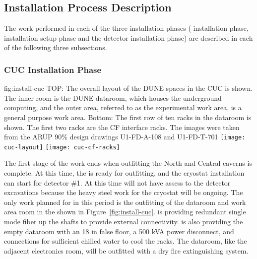 \subsection{Installation Process Description}
\label{sec:fdsp-tc-inst-proc}


The work performed in each of the three installation phases ( installation phase, installation setup phase and the detector installation phase) are described in each of the following three subsections.

\subsubsection{CUC Installation Phase}
\label{sec:fdsp-tc-inst-CUC}

\begin{dunefigure}{fig:install-cuc}
  {TOP: The overall layout of the DUNE spaces in the CUC is shown. The inner room is the DUNE dataroom, which houses the underground computing, and the outer area, referred to as the experimental work area, is a general purpose work area. Bottom: The first row of ten racks in the dataroom is shown. The first two racks are the  CF interface racks. The images were taken from the ARUP 90\% design drawings U1-FD-A-108 and U1-FD-T-701}
\texttt{[image: cuc-layout]}
\vspace{-2pt}
\texttt{[image: cuc-cf-racks]}
\end{dunefigure}


The first stage of the  work ends when outfitting the North and Central caverns is complete. At this time, the  is ready for  outfitting, and the cryostat installation can start for detector \#1. At this time  will not have assess to the detector excavations because the heavy steel work for the cryostat will be ongoing. The only work planned for  in this period is the outfitting of the dataroom and work area room in the  shown in Figure~\ref{fig:install-cuc}.   is providing redundant single mode fiber up the shafts to provide external connectivity.   is also providing the empty dataroom with an 18 \si{in} false floor, a 500 \si{kVA} power disconnect, and connections for sufficient chilled water to cool the racks. The dataroom, like the adjacent  electronics room, will be outfitted with a dry fire extinguishing system. 


